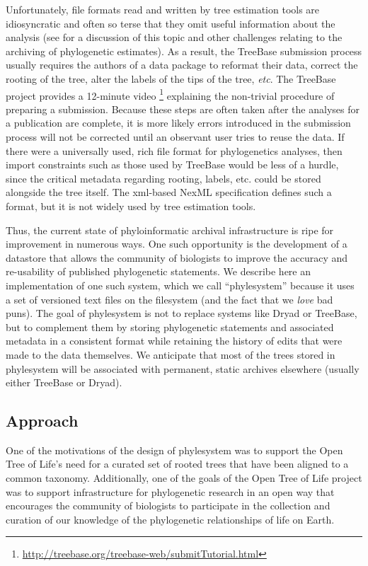 \documentclass{bioinfo}
\newcommand{\ps}{phylesystem\xspace}
\newcommand{\otol}{Open Tree of Life\xspace}
\begin{document}
Unfortunately, file formats read and written by tree estimation tools are idiosyncratic and often so 
    terse that they omit useful information about the analysis (see \citet{StoltzfusEtAl2012} for a discussion
    of this topic and other challenges relating to the archiving of phylogenetic estimates).
As a result, the TreeBase submission process usually requires the authors of a data package to reformat their data, correct
    the rooting of the tree, alter the labels of the tips of the tree, {\em etc}.
The TreeBase project provides a 12-minute video 
    \footnote{\url{http://treebase.org/treebase-web/submitTutorial.html}} 
    explaining the non-trivial procedure of preparing a submission.
Because these steps are often taken after the analyses for a publication are complete, it is more likely 
    errors introduced in the submission process will not be corrected until an observant user tries to reuse the data.
If there were a universally used, rich file format for phylogenetics analyses, then import constraints such as those
    used by TreeBase would be less of a hurdle, since the critical metadata regarding rooting, labels, etc. could be
    stored alongside the tree itself.
The xml-based NexML specification \citep{NeXML} defines such a format, but it is not widely used by tree estimation tools.

Thus, the current state of phyloinformatic archival infrastructure is ripe for improvement in numerous ways.
One such opportunity is the development of a datastore that allows the community of biologists to improve the
    accuracy and re-usability of published phylogenetic statements.
We describe here an implementation of one such system, which we call ``phylesystem'' because it uses a set of
    versioned text files on the filesystem (and the fact that we {\em love} bad puns).
The goal of \ps is not to replace systems like Dryad or TreeBase, but to complement them by 
    storing phylogenetic statements and associated metadata in a consistent format while retaining the history of
    edits that were made to the data themselves.
We anticipate that most of the trees stored in \ps will be associated with permanent, static archives
    elsewhere (usually either TreeBase or Dryad).

\subsection{Approach}
One of the motivations of the design of \ps was to support the \otol's need for a curated set
    of rooted trees that have been aligned to a common taxonomy.
Additionally, one of the goals of the \otol project was to support infrastructure for phylogenetic
    research in an open way that encourages the community of biologists to participate in the 
    collection and curation of our knowledge of the phylogenetic relationships of life on Earth.
\end{document}
